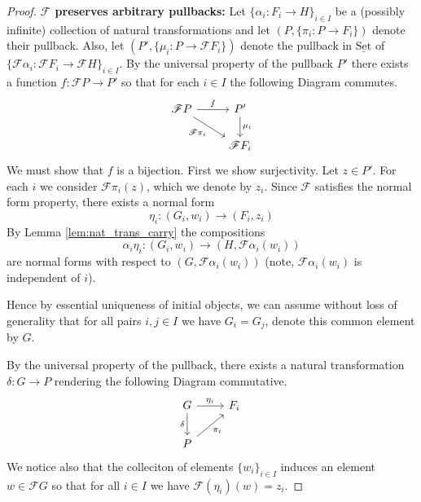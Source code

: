 \documentclass[12pt]{article}
\theoremstyle{plain}
\theoremstyle{definition}
\newcommand{\scr}[1]{\mathscr{#1}}
\newcommand{\lto}{\longrightarrow}
\newcommand{\set}{\operatorname{\underline{Set}}}
\begin{document}
\begin{proof}
		\textbf{$\scr{F}$ preserves arbitrary pullbacks:} Let $\{\alpha_{i}: F_i \lto H\}_{i \in I}$ be a (possibly infinite) collection of natural transformations and let $(P, \{\pi_i: P \lto F_i\})$ denote their pullback. Also, let $(P', \{\mu_i: P \lto \scr{F}F_i \})$ denote the pullback in $\set$ of $\{\scr{F}\alpha_i: \scr{F}F_i \lto \scr{F}H\}_{i \in I}$. By the universal property of the pullback $P'$ there exists a function $f: \scr{F}P \lto P'$ so that for each $i \in I$ the following Diagram commutes.
		\begin{equation}
			\begin{tikzcd}\label{eq:induced_commutativity}
				\scr{F}P\arrow[r,"{f}"]\arrow[dr,swap,"{\scr{F}\pi_i}"] & P'\arrow[d,"{\mu_i}"]\\
				& \scr{F}F_i
				\end{tikzcd}
			\end{equation}
		We must show that $f$ is a bijection. First we show surjectivity. Let $z \in P'$. For each $i$ we consider $\scr{F}\pi_i(z)$, which we denote by $z_i$. Since $\scr{F}$ satisfies the normal form property, there exists a normal form
		\begin{equation}
			\eta_i: (G_i, w_i) \lto (F_i, z_i)
			\end{equation}
		By Lemma \ref{lem:nat_trans_carry} the compositions
		\begin{equation}
			\alpha_i \eta_i: (G_i, w_i) \lto (H, \scr{F}\alpha_i(w_i))
			\end{equation}
		are normal forms with respect to $(G, \scr{F}\alpha_i(w_i))$ (note, $\scr{F}\alpha_i(w_i)$ is independent of $i$).
		
		Hence by essential uniqueness of initial objects, we can assume without loss of generality that for all pairs $i,j \in I$ we have $G_i = G_j$, denote this common element by $G$.
		
		By the universal property of the pullback, there exists a natural transformation $\delta: G \lto P$ rendering the following Diagram commutative.
		\begin{equation}
			\begin{tikzcd}
				G\arrow[d,swap,"{\delta}"]\arrow[r,"{\eta_i}"] & F_i\\
				P\arrow[ur,swap,"{\pi_i}"]
				\end{tikzcd}
			\end{equation}
		We notice also that the colleciton of elements $\lbrace w_i \rbrace_{i \in I}$ induces an element $w \in \scr{F}G$ so that for all $i \in I$ we have $\scr{F}(\eta_i)(w) = z_i$.
	

\end{proof}
\end{document}
